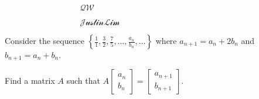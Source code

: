 \documentclass[10pt]{article}
\newcommand{\noin}{\noindent}
\begin{document}
\vspace{0.2in}
$\;\;\;\;\;\;\;\;\;\;\;\;\;\;\;\;\;\;\;\;\;\;\;\;\;\;\;\;\;\;\;\;\;\mathscr{QW}$\\

{\large 
\vspace{-25pt}
\vspace{13pt}
$\;\;\;\;\;\;\;\;\;\;\;\;\;\;\;\;\;\;\;\;\;\;\;\;\;\;\;\;\;\;\;\;\;\mathscr{Justin Lim}$\\
\vspace{-40pt}


}

\vfill







\pagebreak



\noin{\bf 1.} Consider the sequence $\left \{ \displaystyle\frac{1}{1}, \displaystyle\frac{3}{2}, \displaystyle\frac{7}{5}, \dots, \displaystyle\frac{a_n}{b_n}, \dots \right \}$ where $a_{n+1}=a_n+2b_n$ and $b_{n+1}=a_n+b_n$.  

\vspace{20pt}

\noin{(a)} Find a matrix $A$ such that $A\begin{bmatrix} a_n \\ b_n \end{bmatrix} = \begin{bmatrix} a_{n+1}\\ b_{n+1} \end{bmatrix}$.


\end{document}
